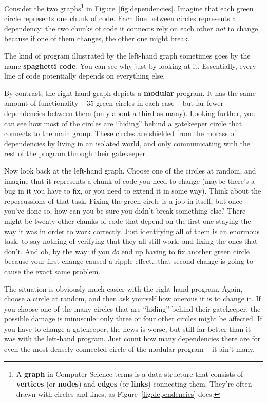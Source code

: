 Consider the two graphs\footnote{A \textbf{graph} in Computer Science terms is
a data structure that consists of \textbf{vertices} (or \textbf{nodes}) and
\textbf{edges} (or \textbf{links}) connecting them. They're often drawn with
circles and lines, as Figure~\ref{fig:dependencies} does.} in
Figure~\ref{fig:dependencies}. Imagine that each green circle represents one
chunk of code. Each line between circles represents a dependency: the two
chunks of code it connects rely on each other \textit{not} to change, because
if one of them changes, the other one might break.

The kind of program illustrated by the left-hand graph sometimes goes by the
name \textbf{spaghetti code}. You can see why just by looking at it.
Essentially, every line of code potentially depends on everything else.

By contrast, the right-hand graph depicts a \textbf{modular} program. It has
the same amount of functionality -- 35 green circles in each case -- but far
fewer dependencies between them (only about a third as many). Looking further,
you can see how most of the circles are ``hiding'' behind a gatekeeper circle
that connects to the main group. These circles are shielded from the morass of
dependencies by living in an isolated world, and only communicating with the
rest of the program through their gatekeeper.

Now look back at the left-hand graph. Choose one of the circles at random, and
imagine that it represents a chunk of code you need to change (maybe there's a
bug in it you have to fix, or you need to extend it in some way). Think about
the repercussions of that task. Fixing the green circle is a job in itself,
but once you've done so, how can you be sure you didn't break something else?
There might be twenty other chunks of code that depend on the first one
staying the way it was in order to work correctly. Just identifying all of
them is an enormous task, to say nothing of verifying that they all still
work, and fixing the ones that don't. And oh, by the way: if you \textit{do}
end up having to fix another green circle because your first change caused a
ripple effect...that second change is going to cause the exact same problem.

The situation is obviously much easier with the right-hand program. Again,
choose a circle at random, and then ask yourself how onerous it is to change
it. If you choose one of the many circles that are ``hiding'' behind their
gatekeeper, the possible damage is minuscule: only three or four other circles
might be affected. If you have to change a gatekeeper, the news is worse, but
still far better than it was with the left-hand program. Just count how many
dependencies there are for even the most densely connected circle of the
modular program -- it ain't many.

